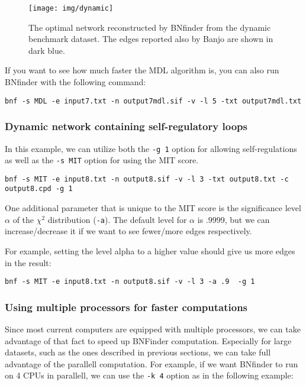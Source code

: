 \begin{figure}[h]
  \centering
   \texttt{[image: img/dynamic]}  
  \caption{The optimal network reconstructed by BNfinder from the dynamic benchmark
    dataset. The edges reported also by Banjo are shown in dark blue. }
  \label{fig:dyn}
\end{figure}

If you want to see how much faster the MDL algorithm is, you can also run BNfinder 
with the following command:
\begin{verbatim}
bnf -s MDL -e input7.txt -n output7mdl.sif -v -l 5 -txt output7mdl.txt
\end{verbatim}

\subsubsection{Dynamic network containing self-regulatory loops}
\label{sec:self-loops}

In this example, we can utilize both the \texttt{-g 1} option for
allowing self-regulations as well as the \texttt{-s MIT} option for
using the MIT score.

\begin{verbatim}
bnf -s MIT -e input8.txt -n output8.sif -v -l 3 -txt output8.txt -c output8.cpd -g 1
\end{verbatim}

One additional parameter that is unique to the MIT score is the
significance level $\alpha$ of the $\chi^2$ distribution
(\texttt{-a}). The default level for $\alpha$ is $.9999$, but we can
increase/decrease it if we want to see fewer/more edges respectively.

For example, setting the level alpha to a higher value should give us more edges in the result:

\begin{verbatim}
bnf -s MIT -e input8.txt -n output8.sif -v -l 3 -a .9  -g 1
\end{verbatim}

\subsubsection{Using multiple processors for faster computations}
\label{sec:multicore}

Since most current computers are equipped with multiple processors, we
can take advantage of that fact to speed up BNFinder
computation. Especially for large datasets, such as the ones described
in previous sections, we can take full advantage of the parallell
computation. For example, if we want BNfinder to run on 4 CPUs in
parallell, we can use the \texttt{-k 4} option as in the following example:

